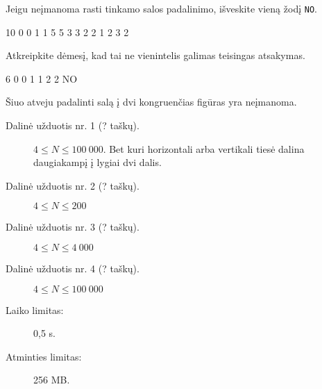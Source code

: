 \documentclass{boi2014-lt}
\newcommand{\constant}[1]{{\tt #1}}
\begin{document}
    Jeigu neįmanoma rasti tinkamo salos padalinimo, išveskite vieną žodį
    \constant{NO}.

    \Examples
	\example
	{
		10  0  0  1  1  5  5  3  3  2  2
	}
	{
		1 2 3 2
	}
	{
		Atkreipkite dėmesį, kad tai ne vienintelis galimas teisingas atsakymas.
		
        \begin{center}
        \end{center}
	}

	\example
	{
		6  0  0  1  1  2  2
	}
	{
		NO
	}
	{
        Šiuo atveju padalinti salą į dvi kongruenčias figūras yra neįmanoma.
        \begin{center}
        \end{center}
	}

    \Scoring

    \begin{description}
        \item[Dalinė užduotis nr. 1 (? taškų).] $4 \le N \le 100\ 000$.
            Bet kuri horizontali arba vertikali tiesė dalina daugiakampį į lygiai
            dvi dalis.
        \item[Dalinė užduotis nr. 2 (? taškų).] $4 \le N \le 200$
        \item[Dalinė užduotis nr. 3 (? taškų).] $4 \le N \le 4\ 000$
        \item[Dalinė užduotis nr. 4 (? taškų).] $4 \le N \le 100\ 000$
    \end{description}

    \Constraints

    \begin{description}
        \item[Laiko limitas:] 0,5 s.
        \item[Atminties limitas:] 256 MB.
    \end{description}
\end{document}

